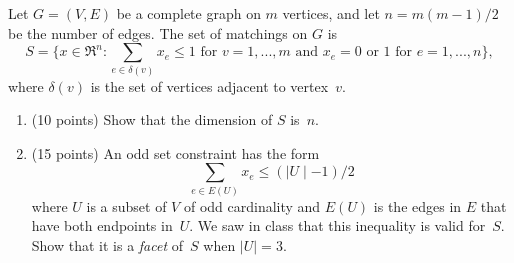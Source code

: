 \begin{enumerate}
    Let $G=(V,E)$ be a complete graph on $m$ vertices, and let $n=m(m-1)/2$ be
    the number of edges.
    The set of matchings on $G$ is
    \begin{displaymath}
       S=\{x\in\Re^n:\sum_{e\in\delta(v)}x_e \leq 1 \mbox{ for } v=1,...,m
          \mbox{ and } x_e = 0 \mbox{ or } 1 \mbox{ for } e=1,...,n\},
    \end{displaymath}
    where $\delta(v)$ is the set of vertices adjacent to vertex~$v$.
    \begin{enumerate}
      \item (10 points)
        Show that the dimension of $S$ is~$n$.
      \item (15 points)
        An odd set constraint has the form
        \begin{displaymath}
          \sum_{e \in E(U)} x_e \leq (\mid\!U\!\mid-1)/2
        \end{displaymath}
        where $U$ is a subset of $V$ of odd cardinality
        and $E(U)$ is the edges in $E$ that have both endpoints in~$U$.
        We saw in class that this inequality is valid for~$S$.
        Show that it is a {\em facet} of~$S$ when $\mid\!U\!\mid=3$.
    \end{enumerate}
\end{enumerate}


